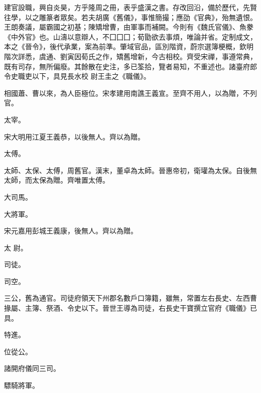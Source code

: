 
\begin{pinyinscope}

 建官設職，興自炎昊，方乎隆周之冊，表乎盛漢之書。存改回沿，備於歷代，先賢往學，以之雕篆者眾矣。若夫胡廣《舊儀》，事惟簡撮；應劭《官典》，殆無遺恨。王朗奏議，屬霸國之初基；陳矯增曹，由軍事而補闕。今則有《魏氏官儀》、魚豢《中外官》也。山濤以意辯人，不囗囗囗；荀勖欲去事煩，唯論并省。定制成文，本之《晉令》，後代承業，案為前準。肇域官品，區別階資，蔚宗選簿梗概，欽明階次詳悉，虞通、劉寅因荀氏之作，矯舊增新，今古相校。齊受宋禪，事遵常典，既有司存，無所偏廢。其餘散在史注，多已筌拾，覽者易知，不重述也。諸臺府郎令史職吏以下，具見長水校
 尉王圭之《職儀》。



 相國蕭、曹以來，為人臣極位。宋孝建用南譙王義宣。至齊不用人，以為贈，不列官。



 太宰。



 宋大明用江夏王義恭，以後無人。齊以為贈。



 太傅。



 太師、太保、太傅，周舊官。漢末，董卓為太師。晉惠帝初，衛瓘為太保。自後無太師，而太保為贈。齊唯置太傅。



 大司馬。



 大將軍。



 宋元嘉用彭城王義康，後無人。齊以為贈。



 太
 尉。



 司徒。



 司空。



 三公，舊為通官。司徒府領天下州郡名數戶口簿籍，雖無，常置左右長史、左西曹掾屬、主簿、祭酒、令史以下。晉世王導為司徒，右長史干寶撰立官府《職儀》已具。



 特進。



 位從公。



 諸開府儀同三司。



 驃騎將軍。




\end{pinyinscope}
